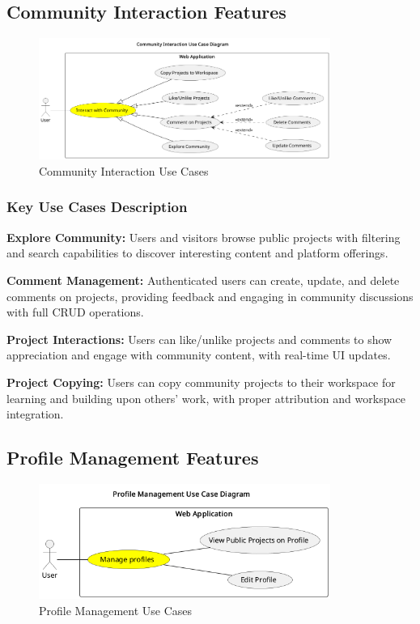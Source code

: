 \subsection{Community Interaction Features}

\begin{figure}[H]
\centering
\includegraphics[width=0.85\textwidth]{conception/SprintV/use_case_diagrams/refined_use_case_feature_community_interaction.png}
\caption{Community Interaction Use Cases}
\label{fig:community_interaction_use_case}
\end{figure}

\subsubsection{Key Use Cases Description}

\textbf{Explore Community:} Users and visitors browse public projects with filtering and search capabilities to discover interesting content and platform offerings.

\textbf{Comment Management:} Authenticated users can create, update, and delete comments on projects, providing feedback and engaging in community discussions with full CRUD operations.

\textbf{Project Interactions:} Users can like/unlike projects and comments to show appreciation and engage with community content, with real-time UI updates.

\textbf{Project Copying:} Users can copy community projects to their workspace for learning and building upon others' work, with proper attribution and workspace integration.

\subsection{Profile Management Features}

\begin{figure}[H]
\centering
\includegraphics[width=0.85\textwidth]{conception/SprintV/use_case_diagrams/refined_use_case_feature_profiles .png}
\caption{Profile Management Use Cases}
\label{fig:profile_management_use_case}
\end{figure}

